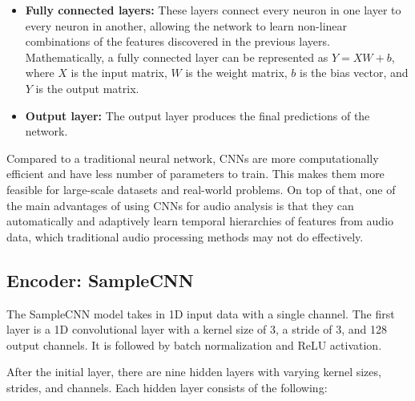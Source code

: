 \begin{itemize}
\item \textbf{Fully connected layers:} These layers connect every neuron in one layer to every neuron in another, allowing the network to learn non-linear combinations of the features discovered in the previous layers. Mathematically, a fully connected layer can be represented as $Y = XW + b$, where $X$ is the input matrix, $W$ is the weight matrix, $b$ is the bias vector, and $Y$ is the output matrix.
\vspace*{3mm}

\item \textbf{Output layer:} The output layer produces the final predictions of the network.

\end{itemize}

Compared to a traditional neural network, CNNs are more computationally efficient and have less number of parameters to train. This makes them more feasible for large-scale datasets and real-world problems. On top of that, one of the main advantages of using CNNs for audio analysis is that they can automatically and adaptively learn temporal hierarchies of features from audio data, which traditional audio processing methods may not do effectively. 




\subsection{Encoder: SampleCNN}

The SampleCNN model \cite{Lee2018SampleCNN:Classification} takes in 1D input data with a single channel. The first layer is a 1D convolutional layer with a kernel size of 3, a stride of 3, and 128 output channels. It is followed by batch normalization and ReLU activation.

After the initial layer, there are nine hidden layers with varying kernel sizes, strides, and channels. Each hidden layer consists of the following:

